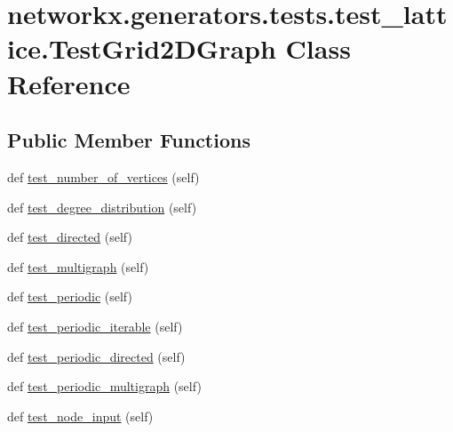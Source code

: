 \hypertarget{classnetworkx_1_1generators_1_1tests_1_1test__lattice_1_1TestGrid2DGraph}{}\section{networkx.\+generators.\+tests.\+test\+\_\+lattice.\+Test\+Grid2\+D\+Graph Class Reference}
\label{classnetworkx_1_1generators_1_1tests_1_1test__lattice_1_1TestGrid2DGraph}
\subsection*{Public Member Functions}
\begin{DoxyCompactItemize}
\item 
def \hyperlink{classnetworkx_1_1generators_1_1tests_1_1test__lattice_1_1TestGrid2DGraph_a77e2e35a6384e3c5fc5d01d1d105d62b}{test\+\_\+number\+\_\+of\+\_\+vertices} (self)
\item 
def \hyperlink{classnetworkx_1_1generators_1_1tests_1_1test__lattice_1_1TestGrid2DGraph_a895540f4d880818ddb89ed7cad66b2c6}{test\+\_\+degree\+\_\+distribution} (self)
\item 
def \hyperlink{classnetworkx_1_1generators_1_1tests_1_1test__lattice_1_1TestGrid2DGraph_a9eb69149bc35c2280a471dd9f0c26c93}{test\+\_\+directed} (self)
\item 
def \hyperlink{classnetworkx_1_1generators_1_1tests_1_1test__lattice_1_1TestGrid2DGraph_a0f58844ce770cea9983874642d74448f}{test\+\_\+multigraph} (self)
\item 
def \hyperlink{classnetworkx_1_1generators_1_1tests_1_1test__lattice_1_1TestGrid2DGraph_a725690b9506b706428071410e292c4c6}{test\+\_\+periodic} (self)
\item 
def \hyperlink{classnetworkx_1_1generators_1_1tests_1_1test__lattice_1_1TestGrid2DGraph_a7a00cf5ba95955a230e438de2edcef43}{test\+\_\+periodic\+\_\+iterable} (self)
\item 
def \hyperlink{classnetworkx_1_1generators_1_1tests_1_1test__lattice_1_1TestGrid2DGraph_a3f34597257d10d6c11d89945faf4fdb9}{test\+\_\+periodic\+\_\+directed} (self)
\item 
def \hyperlink{classnetworkx_1_1generators_1_1tests_1_1test__lattice_1_1TestGrid2DGraph_a8102d791a2716dd4ebe57738e6caa717}{test\+\_\+periodic\+\_\+multigraph} (self)
\item 
def \hyperlink{classnetworkx_1_1generators_1_1tests_1_1test__lattice_1_1TestGrid2DGraph_a73bd07f1215a4285c4dc3a075784529b}{test\+\_\+node\+\_\+input} (self)
\end{DoxyCompactItemize}


